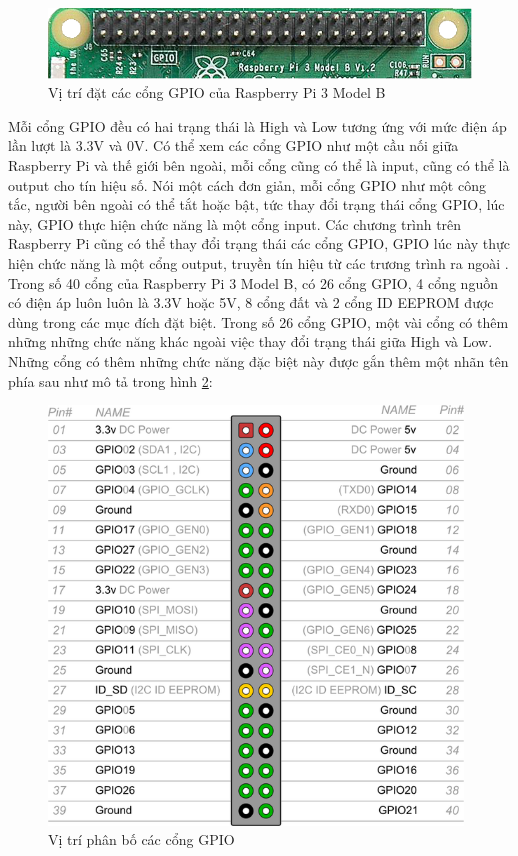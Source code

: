 \documentclass[12pt,a4paper,oneside]{extbook}
\begin{document}
\begin{figure}[h]
  \centering
     \includegraphics[scale=0.7]{4-vi-tri-dat-gpio}
  \caption{Vị trí đặt các cổng GPIO của Raspberry Pi 3 Model B}\label{fig:4-vi-tri-dat-gpio}
\end{figure}

\noindent
Mỗi cổng GPIO đều có hai trạng thái là High và Low tương ứng với mức điện áp lần lượt là 3.3V và 0V. Có thể xem các cổng GPIO như một cầu nối giữa Raspberry Pi và thế giới bên ngoài, mỗi cổng cũng có thể là input, cũng có thể là output cho tín hiệu số. Nói một cách đơn giản, mỗi cổng GPIO như một công tắc, người bên ngoài có thể tắt hoặc bật, tức thay đổi trạng thái cổng GPIO, lúc này, GPIO thực hiện chức năng là một cổng input. Các chương trình trên Raspberry Pi cũng có thể thay đổi trạng thái các cổng GPIO, GPIO lúc này thực hiện chức năng là một cổng output, truyền tín hiệu từ các trương trình ra ngoài \cite{raspberry-gpio}.\\

\noindent
Trong số 40 cổng của Raspberry Pi 3 Model B, có 26 cổng GPIO, 4 cổng nguồn có điện áp luôn luôn là 3.3V hoặc 5V, 8 cổng đất và 2 cổng ID EEPROM được dùng trong các mục đích đặt biệt. Trong số 26 cổng GPIO, một vài cổng có thêm những những chức năng khác ngoài việc thay đổi trạng thái giữa High và Low. Những cổng có thêm những chức năng đặc biệt này được gắn thêm một nhãn tên phía sau như mô tả trong hình \ref{fig:4-pi3-gpio}: 

\begin{figure}[h]
  \centering
     \includegraphics[width=11cm]{4-pi3-gpio}
  \caption{Vị trí phân bố các cổng GPIO}\label{fig:4-pi3-gpio}
\end{figure}
\end{document}
